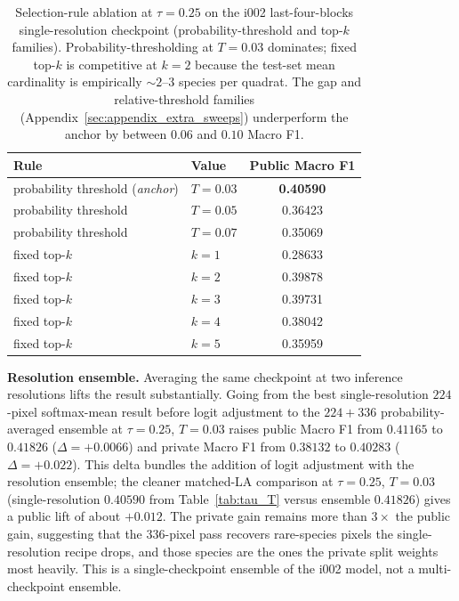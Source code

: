 \begin{table}[ht]
  \centering
  \small
  \begin{tabular}{llc}
    \toprule
    Rule & Value & Public Macro F1 \\
    \midrule
    probability threshold (\emph{anchor}) & $T{=}0.03$ & \textbf{0.40590} \\
    probability threshold               & $T{=}0.05$ & 0.36423 \\
    probability threshold               & $T{=}0.07$ & 0.35069 \\
    \midrule
    fixed top-$k$                       & $k{=}1$    & 0.28633 \\
    fixed top-$k$                       & $k{=}2$    & 0.39878 \\
    fixed top-$k$                       & $k{=}3$    & 0.39731 \\
    fixed top-$k$                       & $k{=}4$    & 0.38042 \\
    fixed top-$k$                       & $k{=}5$    & 0.35959 \\
    \bottomrule
  \end{tabular}
  \caption{Selection-rule ablation at $\tau{=}0.25$ on the i002 last-four-blocks single-resolution checkpoint (probability-threshold and top-$k$ families). Probability-thresholding at $T{=}0.03$ dominates; fixed top-$k$ is competitive at $k{=}2$ because the test-set mean cardinality is empirically ${\sim}2$--$3$ species per quadrat. The gap and relative-threshold families (Appendix~\ref{sec:appendix_extra_sweeps}) underperform the anchor by between $0.06$ and $0.10$ Macro F1.}
  \label{tab:select_rule}
\end{table}

\textbf{Resolution ensemble.} Averaging the same checkpoint at two inference resolutions lifts
the result substantially. Going from the best single-resolution $224$-pixel softmax-mean result
before logit adjustment to the $224{+}336$ probability-averaged ensemble at $\tau{=}0.25$,
$T{=}0.03$ raises public Macro F1 from $0.41165$ to $0.41826$ ($\Delta{=}{+}0.0066$) and private
Macro F1 from $0.38132$ to $0.40283$ ($\Delta{=}{+}0.022$). This delta bundles the addition of
logit adjustment with the resolution ensemble; the cleaner matched-LA comparison at $\tau{=}0.25$,
$T{=}0.03$ (single-resolution $0.40590$ from Table~\ref{tab:tau_T} versus ensemble $0.41826$)
gives a public lift of about $+0.012$. The private gain remains more than $3\times$ the public
gain, suggesting that the $336$-pixel pass recovers rare-species pixels the single-resolution
recipe drops, and those species are the ones the private split weights most heavily. This is a
single-checkpoint ensemble of the i002 model, not a multi-checkpoint ensemble.

